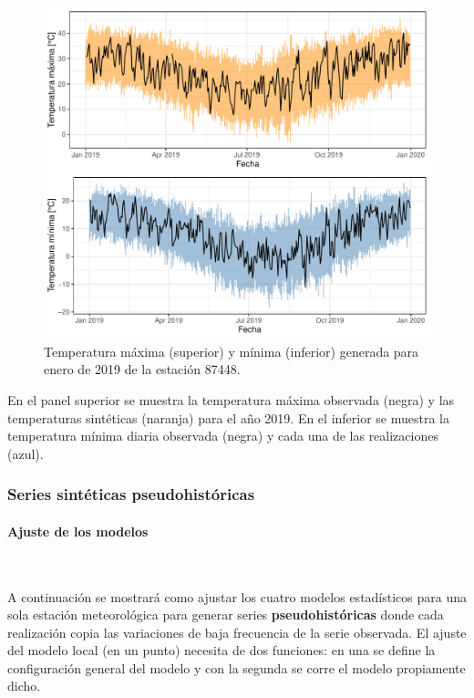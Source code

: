 \documentclass[
  12pt]{article}
\begin{document}
\begin{figure}[H]

{\centering \includegraphics{Manual_Generador_files/figure-latex/temp-ind-1} 

}

\caption{Temperatura máxima (superior) y mínima (inferior) generada para enero de 2019 de la estación 87448.}\label{fig:temp-ind}
\end{figure}

En el panel superior se muestra la temperatura máxima observada (negra) y las temperaturas sintéticas (naranja) para el año 2019. En el inferior se muestra la temperatura mínima diaria observada (negra) y cada una de las realizaciones (azul).

\hypertarget{series-sintuxe9ticas-pseudohistuxf3ricas}{%
\subsubsection{Series sintéticas pseudohistóricas}\label{series-sintuxe9ticas-pseudohistuxf3ricas}}

\hypertarget{ajuste-de-los-modelos-1}{%
\paragraph{Ajuste de los modelos}\label{ajuste-de-los-modelos-1}}

~

A continuación se mostrará como ajustar los cuatro modelos estadísticos para una sola estación meteorológica para generar series \textbf{pseudohistóricas} donde cada realización copia las variaciones de baja frecuencia de la serie observada.
El ajuste del modelo local (en un punto) necesita de dos funciones: en una se define la configuración general del modelo y con la segunda se corre el modelo propiamente dicho.
\end{document}
